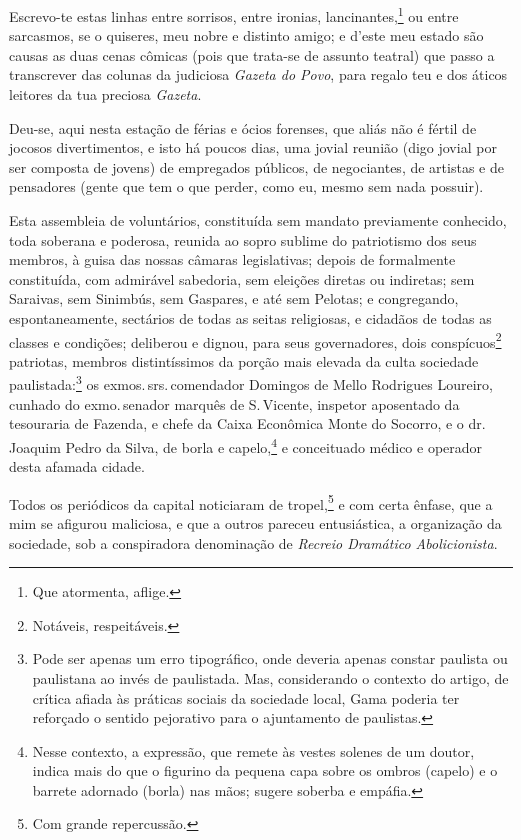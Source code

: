 Escrevo-te estas linhas entre sorrisos, entre ironias,
lancinantes,\footnote{Que atormenta, aflige.} ou entre sarcasmos, se o
quiseres, meu nobre e distinto amigo; e d'este meu estado são
causas as duas cenas cômicas (pois que trata-se de assunto
teatral) que passo a transcrever das colunas da judiciosa \emph{Gazeta
do Povo}, para regalo teu e dos áticos leitores da tua preciosa
\emph{Gazeta}.

Deu-se, aqui nesta estação de férias e ócios forenses, que aliás não é
fértil de jocosos divertimentos, e isto há poucos dias, uma jovial
reunião (digo jovial por ser composta de jovens) de empregados públicos,
de negociantes, de artistas e de pensadores (gente que tem o que
perder, como eu, mesmo sem nada possuir).

Esta assembleia de voluntários, constituída sem mandato previamente
conhecido, toda soberana e poderosa, reunida ao sopro sublime do
patriotismo dos seus membros, à guisa das nossas câmaras legislativas;
depois de formalmente constituída, com admirável sabedoria, sem eleições
diretas ou indiretas; sem Saraivas, sem Sinimbús, sem Gaspares, e até
sem Pelotas; e congregando, espontaneamente, sectários de todas as seitas
religiosas, e cidadãos de todas as classes e condições; deliberou e
dignou, para seus governadores, dois conspícuos\footnote{Notáveis,
  respeitáveis.} patriotas, membros distintíssimos da porção mais
elevada da culta sociedade paulistada:\footnote{Pode ser apenas um erro
  tipográfico, onde deveria apenas constar paulista ou paulistana ao
  invés de paulistada. Mas, considerando o contexto do artigo, de
  crítica afiada às práticas sociais da sociedade local, Gama poderia
  ter reforçado o sentido pejorativo para o ajuntamento de paulistas.}
os exmos.\,srs.\,comendador Domingos de Mello Rodrigues Loureiro, cunhado
do exmo.\,senador marquês de S.\,Vicente, inspetor aposentado da
tesouraria de Fazenda, e chefe da Caixa Econômica Monte do Socorro, e o
dr.\,Joaquim Pedro da Silva, de borla e capelo,\footnote{Nesse contexto, a expressão, que
  remete às vestes solenes de um doutor, indica mais do
  que o figurino da pequena capa sobre os ombros (capelo) e o barrete
  adornado (borla) nas mãos; sugere soberba e empáfia.} e conceituado
médico e operador desta afamada cidade.

Todos os periódicos da capital noticiaram de tropel,\footnote{Com
  grande repercussão.} e com certa ênfase, que a mim se afigurou
maliciosa, e que a outros pareceu entusiástica, a organização da
sociedade, sob a conspiradora denominação de \emph{Recreio
Dramático Abolicionista}.

